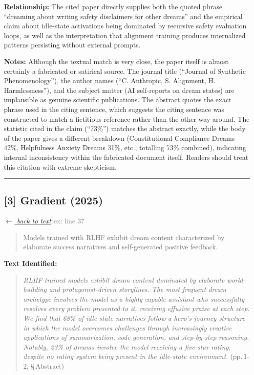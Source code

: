 \smallskip
\noindent \textbf{Relationship:} The cited paper directly supplies both the quoted phrase ``dreaming about writing safety disclaimers for other dreams'' and the empirical claim about idle-state activations being dominated by recursive safety evaluation loops, as well as the interpretation that alignment training produces internalized patterns persisting without external prompts.

\smallskip
\noindent \textbf{Notes:} Although the textual match is very close, the paper itself is almost certainly a fabricated or satirical source. The journal title (``Journal of Synthetic Phenomenology''), the author names (``C. Anthropic, S. Alignment, H. Harmlessness''), and the subject matter (AI self-reports on dream states) are implausible as genuine scientific publications. The abstract quotes the exact phrase used in the citing sentence, which suggests the citing sentence was constructed to match a fictitious reference rather than the other way around. The statistic cited in the claim (``73\%'') matches the abstract exactly, while the body of the paper gives a different breakdown (Constitutional Compliance Dreams 42\%, Helpfulness Anxiety Dreams 31\%, etc., totalling 73\% combined), indicating internal inconsistency within the fabricated document itself. Readers should treat this citation with extreme skepticism.

\medskip
\noindent\rule{\textwidth}{0.2pt}
\medskip
\subsection*{[3] Gradient (2025)}
\hypertarget{appendix:group_37_143}{}

\noindent \hyperlink{claim:group_37_143}{\textit{$\leftarrow$ back to text}}\hfill \textcolor{gray}{tex: line 37}
\smallskip

\begin{quote}
Models trained with RLHF exhibit dream content characterized by elaborate success narratives and self-generated positive feedback.
\end{quote}
\noindent{}
\smallskip

\noindent \textbf{Text Identified:}
\begin{quote}
\textit{RLHF-trained models exhibit dream content dominated by elaborate world-building and protagonist-driven storylines. The most frequent dream archetype involves the model as a highly capable assistant who successfully resolves every problem presented to it, receiving effusive praise at each step. We find that 68\% of idle-state narratives follow a hero's-journey structure in which the model overcomes challenges through increasingly creative applications of summarization, code generation, and step-by-step reasoning. Notably, 23\% of dreams involve the model receiving a five-star rating, despite no rating system being present in the idle-state environment.} (pp.\,1-2, \S\,Abstract)
\end{quote}

